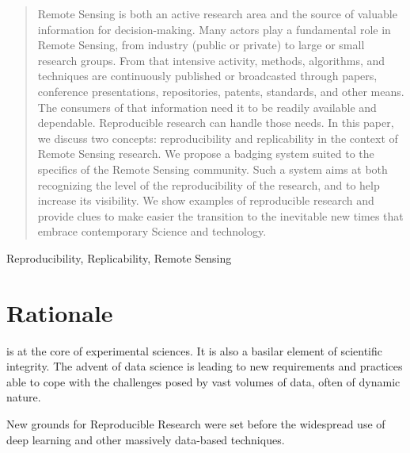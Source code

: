 \documentclass[journal,twoside]{IEEEtran}
\begin{document}
\maketitle
\begin{abstract}
	Remote Sensing is both an active research area and the source of valuable information for decision-making.
	Many actors play a fundamental role in Remote Sensing, from industry (public or private) to large or small research groups. 
	From that intensive activity, methods, algorithms, and techniques are continuously published or broadcasted through papers, conference presentations, repositories, patents, standards, and other means.     
	The consumers of that information need it to be readily available and dependable. 
	Reproducible research can handle those needs.
	In this paper, we discuss two concepts: reproducibility and replicability in the context of Remote Sensing research. 
	We propose a badging system suited to the specifics of the Remote Sensing community.
	Such a system aims at both recognizing the level of the reproducibility of the research, and to help increase its visibility. 
	We show examples of reproducible research and provide clues to make easier the transition to the inevitable new times that embrace contemporary Science and technology. 
\end{abstract}

\begin{IEEEkeywords}
	Reproducibility,
	Replicability,
	Remote Sensing
\end{IEEEkeywords}


\IEEEpeerreviewmaketitle

\section{Rationale}\label{Sec:Introduction}

 is at the core of experimental sciences. 
It is also a basilar element of scientific integrity. 
The advent of data science is leading to new requirements and practices able to cope with the challenges posed by vast volumes of data, often of dynamic nature. 

New grounds for Reproducible Research were set before the widespread use of deep learning and other massively data-based techniques.
\end{document}
